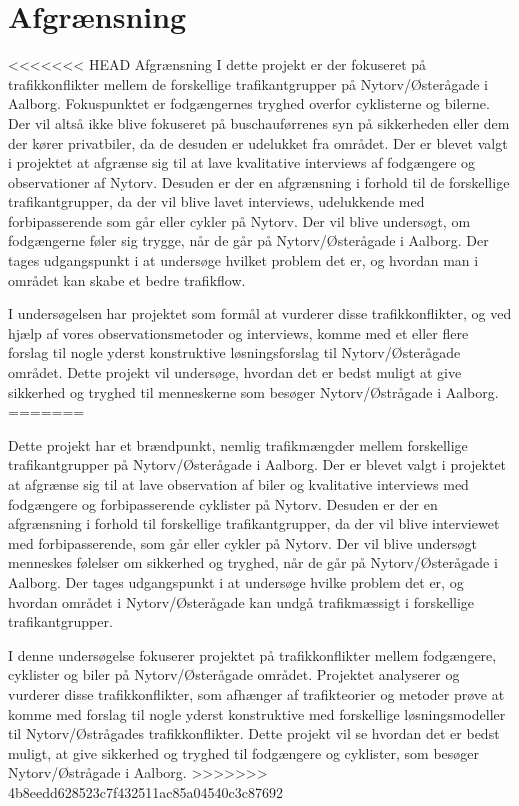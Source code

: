 \chapter{Afgrænsning}
\label{chap:Afgrænsning}

<<<<<<< HEAD
Afgrænsning
I dette projekt er der fokuseret på trafikkonflikter mellem de forskellige trafikantgrupper på Nytorv/Østerågade i Aalborg. Fokuspunktet er fodgængernes tryghed overfor cyklisterne og bilerne. Der vil altså ikke blive fokuseret på buschauførrenes syn på sikkerheden eller dem der kører privatbiler, da de desuden er udelukket fra området. Der er blevet valgt i projektet at afgrænse sig til at lave kvalitative interviews af fodgængere og observationer af Nytorv. Desuden er der en afgrænsning i forhold til de forskellige trafikantgrupper, da der vil blive lavet interviews, udelukkende med forbipasserende som går eller cykler på Nytorv. Der vil blive undersøgt, om fodgængerne føler sig trygge, når de går på Nytorv/Østerågade i Aalborg. Der tages udgangspunkt i at undersøge hvilket problem det er, og hvordan man i området kan skabe et bedre trafikflow.

I undersøgelsen har projektet som formål at vurderer disse trafikkonflikter, og ved hjælp af vores observationsmetoder og interviews, komme med et eller flere forslag til nogle yderst konstruktive løsningsforslag til Nytorv/Østerågade området.  Dette projekt vil undersøge, hvordan det er bedst muligt at give sikkerhed og tryghed til menneskerne som besøger Nytorv/Østrågade i Aalborg.
=======



Dette projekt har et brændpunkt, nemlig trafikmængder mellem forskellige trafikantgrupper på Nytorv/Østerågade i Aalborg. Der er blevet valgt i projektet at afgrænse sig til at lave observation af biler og kvalitative interviews med fodgængere og forbipasserende cyklister på Nytorv. Desuden er der en afgrænsning i forhold til forskellige trafikantgrupper, da der vil blive interviewet med forbipasserende, som går eller cykler på Nytorv. Der vil blive undersøgt menneskes følelser om sikkerhed og tryghed, når de går på Nytorv/Østerågade i Aalborg. Der tages udgangspunkt i at undersøge hvilke problem det er, og hvordan området i Nytorv/Østerågade kan undgå trafikmæssigt i forskellige trafikantgrupper.



I denne undersøgelse fokuserer projektet på trafikkonflikter mellem fodgængere, cyklister og biler på Nytorv/Østerågade området. Projektet analyserer og vurderer disse trafikkonflikter, som afhænger af trafikteorier og metoder prøve at komme med forslag til nogle yderst konstruktive med forskellige løsningsmodeller til Nytorv/Østrågades trafikkonflikter.  Dette projekt vil se hvordan det er bedst muligt, at give sikkerhed og tryghed til fodgængere og cyklister, som besøger Nytorv/Østrågade i Aalborg.
>>>>>>> 4b8eedd628523c7f432511ac85a04540c3c87692

